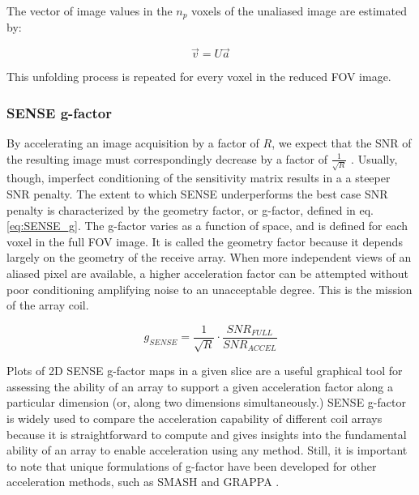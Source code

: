 The vector of image values in the $n_p$ voxels of the unaliased image are estimated by:

\begin{equation}
    \vec{v} = U\vec{a}
\end{equation}

This unfolding process is repeated for every voxel in the reduced FOV image.

\subsubsection{SENSE g-factor}
By accelerating an image acquisition by a factor of $R$, we expect that the SNR of the resulting image must
correspondingly decrease by a factor of $\frac{1}{\sqrt{R}}$ \cite{nishimura}. Usually, though, imperfect conditioning
of the sensitivity matrix results in a a steeper SNR penalty. The extent to which SENSE underperforms the best case SNR
penalty is characterized by the geometry factor, or g-factor, defined in eq. \ref{eq:SENSE_g}. The g-factor varies as a
function of space, and is defined for each voxel in the full FOV image. It is called the geometry factor because it
depends largely on the geometry of the receive array. When more independent views of an aliased pixel are available, a
higher acceleration factor can be attempted without poor conditioning amplifying noise to an unacceptable degree. This
is the mission of the array coil.

\begin{equation}\label{eq:SENSE_g}
    g_{SENSE} = \frac{1}{\sqrt{R}} \cdot \frac{SNR_{FULL}}{SNR_{ACCEL}}
\end{equation}

Plots of 2D SENSE g-factor maps in a given slice are a useful graphical tool for assessing the ability of an array to support
a given acceleration factor along a particular dimension (or, along two dimensions simultaneously.) SENSE g-factor is
widely used to compare the acceleration capability of different coil arrays because it is straightforward to compute and
gives insights into the fundamental ability of an array to enable acceleration using any method. Still, it is important
to note that unique formulations of g-factor have been developed for other acceleration methods, such as SMASH and GRAPPA \cite{Breuer2009}.
